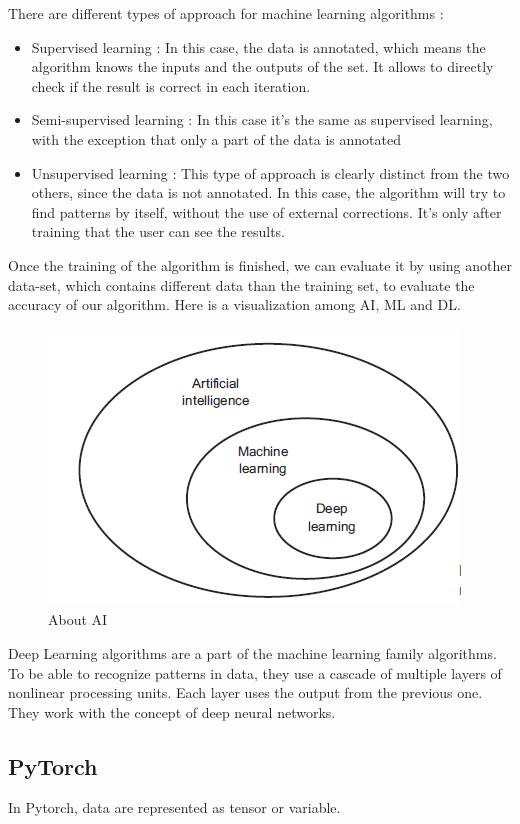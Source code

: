 There are different types of approach for machine learning algorithms :
\begin{itemize}
\item Supervised learning : In this case, the data is annotated, which means the algorithm knows the inputs and the outputs of the set. It allows to directly check if the result is correct in each iteration.
\item Semi-supervised learning : In this case it's the same as supervised learning, with the exception that only a part of the data is annotated
\item Unsupervised learning : This type of approach is clearly distinct from the two others, since the data is not annotated. In this case, the algorithm will try to find patterns by itself, without the use of external corrections. It's only after training that the user can see the results.
\end{itemize}

Once the training of the algorithm is finished, we can evaluate it by using another data-set, which contains different data than the training set, to evaluate the accuracy of our algorithm. \usetikzlibrary{}Here is a visualization among AI, ML and DL.

\begin{figure}[!ht]
    \center
    \includegraphics[scale=0.5]{figures/aivsmlvsdl.png}
    \caption{About AI}
\end{figure}

Deep Learning algorithms are a part of the machine learning family algorithms. To be able to recognize patterns in data, they use a cascade of multiple layers of nonlinear processing units. Each layer uses the output from the previous one. They work with the concept of deep neural networks.

\newpage
\subsection{PyTorch}
In Pytorch, data are represented as tensor or variable.
